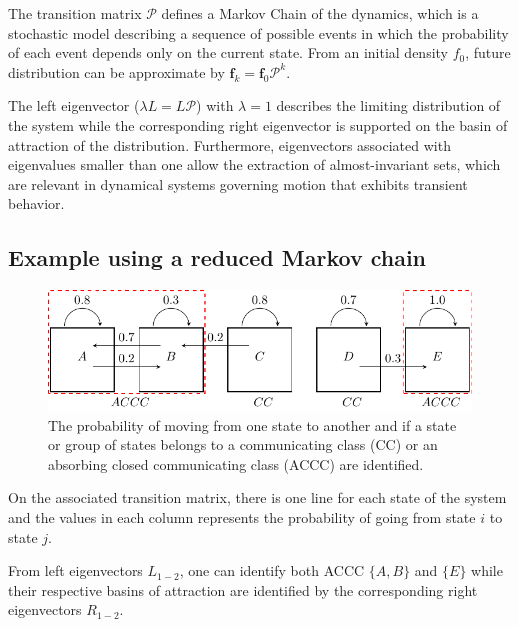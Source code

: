 \documentclass[final]{beamer}
\newcommand{\PF}{\mathcal{P}}
\begin{document}
\begin{frame}[t]
\begin{multicols}{3}
The transition matrix $\PF$ defines a Markov Chain of the dynamics, which is a
stochastic model describing a sequence of possible events in which the
probability of each event depends only on the current state. From an initial
density $f_0$, future distribution can be approximate by $\mathbf{f}_k =
\mathbf{f}_0 \PF^k$.

The left eigenvector ($\lambda L = L \PF$) with $\lambda = 1$ describes the
limiting distribution of the system while the corresponding right eigenvector
is supported on the basin of attraction of the distribution.  Furthermore,
eigenvectors associated with eigenvalues smaller than one allow the extraction
of almost-invariant sets, which are relevant in dynamical systems governing
motion that exhibits transient behavior.

\subsection{Example using a reduced Markov chain}
\begin{figure}[!ht]
  \centering
  \includegraphics[width=0.8\columnwidth]{figures/fig01}
\caption{The probability of moving from one state to another and if a state or
group of states belongs to a communicating class (CC) or an absorbing closed
communicating class (ACCC) are identified.}
  \label{fig:ccc}
\end{figure}
On the associated transition matrix, there is one line for each state of the
system and the values in each column represents the probability of going from
state $i$ to state $j$.

\vspace{0.5cm}
\columnbreak
From left eigenvectors $L_{1-2}$, one can identify both ACCC $\lbrace A,
B\rbrace$ and  $\lbrace E \rbrace$ while their respective basins of attraction
are identified by the corresponding right eigenvectors $R_{1-2}$.


\end{multicols}
\end{frame}
\end{document}
